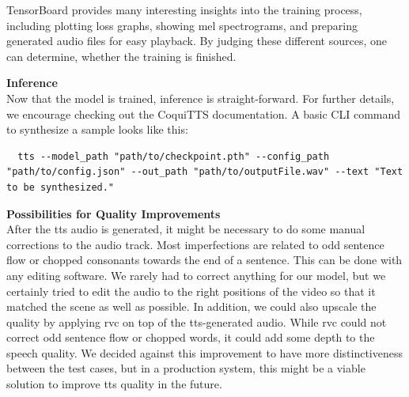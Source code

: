 \documentclass[
  a4paper,  %
  twoside,  %
  bibliography=totoc,
  headsepline,
  cleardoublepage=empty,
  parskip=half,
  draft=false
]{scrbook}
\begin{document}
TensorBoard provides many interesting insights into the training process, including plotting loss graphs, showing mel spectrograms, and preparing generated audio files for easy playback. By judging these different sources, one can determine, whether the training is finished. 

\textbf{Inference} \\
Now that the model is trained, inference is straight-forward. For further details, we encourage checking out the CoquiTTS documentation. A basic CLI command to synthesize a sample looks like this:
\begin{lstlisting}
  tts --model_path "path/to/checkpoint.pth" --config_path "path/to/config.json" --out_path "path/to/outputFile.wav" --text "Text to be synthesized."
\end{lstlisting}

\textbf{Possibilities for Quality Improvements} \\
After the \gls{tts} audio is generated, it might be necessary to do some manual corrections to the audio track. Most imperfections are related to odd sentence flow or chopped consonants towards the end of a sentence. This can be done with any editing software. We rarely had to correct anything for our model, but we certainly tried to edit the audio to the right positions of the video so that it matched the scene as well as possible. In addition, we could also upscale the quality by applying \gls{rvc} on top of the \gls{tts}-generated audio. While \gls{rvc} could not correct odd sentence flow or chopped words, it could add some depth to the speech quality. We decided against this improvement to have more distinctiveness between the test cases, but in a production system, this might be a viable solution to improve \gls{tts} quality in the future. 
\end{document}
